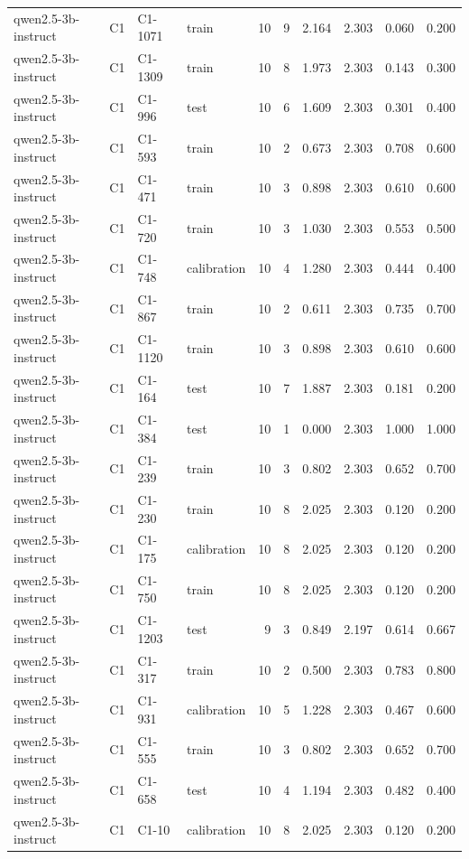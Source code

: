 \begin{table}
\begin{tabular}{llllrrrrrr}
qwen2.5-3b-instruct & C1 & C1-1071 & train & 10 & 9 & 2.164 & 2.303 & 0.060 & 0.200 \\
qwen2.5-3b-instruct & C1 & C1-1309 & train & 10 & 8 & 1.973 & 2.303 & 0.143 & 0.300 \\
qwen2.5-3b-instruct & C1 & C1-996 & test & 10 & 6 & 1.609 & 2.303 & 0.301 & 0.400 \\
qwen2.5-3b-instruct & C1 & C1-593 & train & 10 & 2 & 0.673 & 2.303 & 0.708 & 0.600 \\
qwen2.5-3b-instruct & C1 & C1-471 & train & 10 & 3 & 0.898 & 2.303 & 0.610 & 0.600 \\
qwen2.5-3b-instruct & C1 & C1-720 & train & 10 & 3 & 1.030 & 2.303 & 0.553 & 0.500 \\
qwen2.5-3b-instruct & C1 & C1-748 & calibration & 10 & 4 & 1.280 & 2.303 & 0.444 & 0.400 \\
qwen2.5-3b-instruct & C1 & C1-867 & train & 10 & 2 & 0.611 & 2.303 & 0.735 & 0.700 \\
qwen2.5-3b-instruct & C1 & C1-1120 & train & 10 & 3 & 0.898 & 2.303 & 0.610 & 0.600 \\
qwen2.5-3b-instruct & C1 & C1-164 & test & 10 & 7 & 1.887 & 2.303 & 0.181 & 0.200 \\
qwen2.5-3b-instruct & C1 & C1-384 & test & 10 & 1 & 0.000 & 2.303 & 1.000 & 1.000 \\
qwen2.5-3b-instruct & C1 & C1-239 & train & 10 & 3 & 0.802 & 2.303 & 0.652 & 0.700 \\
qwen2.5-3b-instruct & C1 & C1-230 & train & 10 & 8 & 2.025 & 2.303 & 0.120 & 0.200 \\
qwen2.5-3b-instruct & C1 & C1-175 & calibration & 10 & 8 & 2.025 & 2.303 & 0.120 & 0.200 \\
qwen2.5-3b-instruct & C1 & C1-750 & train & 10 & 8 & 2.025 & 2.303 & 0.120 & 0.200 \\
qwen2.5-3b-instruct & C1 & C1-1203 & test & 9 & 3 & 0.849 & 2.197 & 0.614 & 0.667 \\
qwen2.5-3b-instruct & C1 & C1-317 & train & 10 & 2 & 0.500 & 2.303 & 0.783 & 0.800 \\
qwen2.5-3b-instruct & C1 & C1-931 & calibration & 10 & 5 & 1.228 & 2.303 & 0.467 & 0.600 \\
qwen2.5-3b-instruct & C1 & C1-555 & train & 10 & 3 & 0.802 & 2.303 & 0.652 & 0.700 \\
qwen2.5-3b-instruct & C1 & C1-658 & test & 10 & 4 & 1.194 & 2.303 & 0.482 & 0.400 \\
qwen2.5-3b-instruct & C1 & C1-10 & calibration & 10 & 8 & 2.025 & 2.303 & 0.120 & 0.200 \\

\end{tabular}
\end{table}
